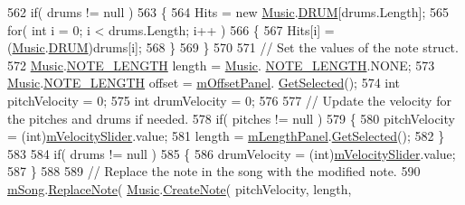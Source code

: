 \begin{DoxyCode}
562                 \textcolor{keywordflow}{if}( drums != null )
563                 \{
564                     Hits = \textcolor{keyword}{new} \hyperlink{class_music}{Music}.\hyperlink{group___music_enums_gade475b4382c7066d1af13e7c13c029b6}{DRUM}[drums.Length];
565                     \textcolor{keywordflow}{for}( \textcolor{keywordtype}{int} i = 0; i < drums.Length; i++ )
566                     \{
567                         Hits[i] = (\hyperlink{class_music}{Music}.\hyperlink{group___music_enums_gade475b4382c7066d1af13e7c13c029b6}{DRUM})drums[i];
568                     \}
569                 \}
570 
571                 \textcolor{comment}{// Set the values of the note struct.}
572                 \hyperlink{class_music}{Music}.\hyperlink{group___music_enums_gaf11b5f079adbb21c800b9eca1c5c3cbd}{NOTE\_LENGTH} length = \hyperlink{class_music}{Music}.
      \hyperlink{group___music_enums_gaf11b5f079adbb21c800b9eca1c5c3cbd}{NOTE\_LENGTH}.NONE;
573                 \hyperlink{class_music}{Music}.\hyperlink{group___music_enums_gaf11b5f079adbb21c800b9eca1c5c3cbd}{NOTE\_LENGTH} offset = \hyperlink{group___s_c_m_priv_var_ga86a44007a4b127d7aa61f75dd34a3409}{mOffsetPanel}.
      \hyperlink{group___s_c_m_nest_class_ae73f2b2c2f567ecaf6ce10f85c30956a}{GetSelected}();
574                 \textcolor{keywordtype}{int} pitchVelocity = 0;
575                 \textcolor{keywordtype}{int} drumVelocity = 0;
576 
577                 \textcolor{comment}{// Update the velocity for the pitches and drums if needed.}
578                 \textcolor{keywordflow}{if}( pitches != null )
579                 \{
580                     pitchVelocity = (int)\hyperlink{group___s_c_m_priv_var_ga7316e5e8f15d1574fc6cb4bd739bbf0a}{mVelocitySlider}.value;
581                     length = \hyperlink{group___s_c_m_priv_var_gadb8dedf80fbe474a1c94cdc95d088a6f}{mLengthPanel}.\hyperlink{group___s_c_m_nest_class_ae73f2b2c2f567ecaf6ce10f85c30956a}{GetSelected}();
582                 \}
583 
584                 \textcolor{keywordflow}{if}( drums != null )
585                 \{
586                     drumVelocity = (int)\hyperlink{group___s_c_m_priv_var_ga7316e5e8f15d1574fc6cb4bd739bbf0a}{mVelocitySlider}.value;
587                 \}
588 
589                 \textcolor{comment}{// Replace the note in the song with the modified note.}
590                 \hyperlink{group___s_c_m_priv_var_gabd8329149faef65a689650d951a9abc9}{mSong}.\hyperlink{group___song_pub_func_ga326d61c75339080057a02c6decb0cde3}{ReplaceNote}( \hyperlink{class_music}{Music}.\hyperlink{group___music_stat_func_gaaf74885e43eb623f64f961985fadcd08}{CreateNote}( pitchVelocity, length, 

\end{DoxyCode}
